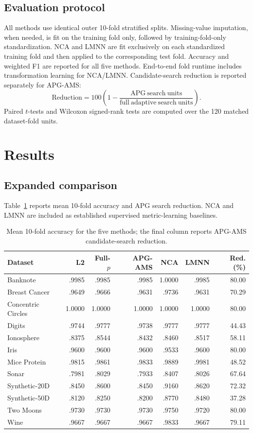 \documentclass[11pt]{article}
\begin{document}
\subsection{Evaluation protocol}
All methods use identical outer 10-fold stratified splits. Missing-value imputation, when needed, is fit on the training fold only, followed by training-fold-only standardization. NCA and LMNN are fit exclusively on each standardized training fold and then applied to the corresponding test fold. Accuracy and weighted F1 are reported for all five methods. End-to-end fold runtime includes transformation learning for NCA/LMNN. Candidate-search reduction is reported separately for APG-AMS:
\begin{equation}
\mathrm{Reduction}=100\left(1-\frac{\mathrm{APG\ search\ units}}{\mathrm{full\ adaptive\ search\ units}}\right).
\end{equation}
Paired $t$-tests and Wilcoxon signed-rank tests are computed over the 120 matched dataset-fold units.

\section{Results}
\subsection{Expanded comparison}
Table~\ref{tab:main} reports mean 10-fold accuracy and APG search reduction. NCA and LMNN are included as established supervised metric-learning baselines.

\begin{table}[ht]
\centering
\caption{Mean 10-fold accuracy for the five methods; the final column reports APG-AMS candidate-search reduction.}
\label{tab:main}
\small
\begin{tabular}{lrrrrrr}
\toprule
Dataset & L2 & Full-$p$ & APG-AMS & NCA & LMNN & Red. (\%)\\
\midrule
Banknote & .9985 & .9985 & .9985 & 1.0000 & .9985 & 80.00\\
Breast Cancer & .9649 & .9666 & .9631 & .9736 & .9631 & 70.29\\
Concentric Circles & 1.0000 & 1.0000 & 1.0000 & 1.0000 & 1.0000 & 80.00\\
Digits & .9744 & .9777 & .9738 & .9777 & .9777 & 44.43\\
Ionosphere & .8375 & .8544 & .8432 & .8460 & .8517 & 58.11\\
Iris & .9600 & .9600 & .9600 & .9533 & .9600 & 80.00\\
Mice Protein & .9815 & .9861 & .9833 & .9889 & .9981 & 48.52\\
Sonar & .7981 & .8029 & .7933 & .8407 & .8026 & 67.64\\
Synthetic-20D & .8450 & .8600 & .8450 & .9160 & .8620 & 72.32\\
Synthetic-50D & .8120 & .8250 & .8200 & .8770 & .8480 & 37.28\\
Two Moons & .9730 & .9730 & .9730 & .9750 & .9720 & 80.00\\
Wine & .9667 & .9667 & .9667 & .9833 & .9667 & 79.11\\
\bottomrule
\end{tabular}
\end{table}
\end{document}
